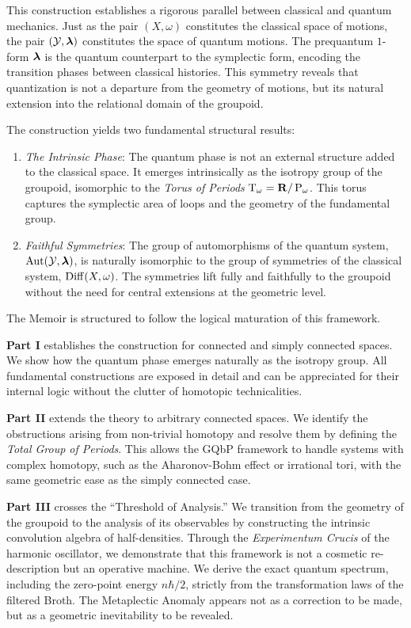 This construction establishes a rigorous parallel between classical and quantum mechanics.
Just as the pair $(X, \omega)$ constitutes the classical space of motions,
the pair $(\mathcal{Y}, \boldsymbol \lambda)$ constitutes the space of quantum motions.
The prequantum $1$-form $\boldsymbol \lambda$ is the quantum counterpart to the symplectic form,
encoding the transition phases between classical histories.
This symmetry reveals that quantization is not a departure from the geometry of motions,
but its natural extension into the relational domain of the groupoid.

The construction yields two fundamental structural results:
\begin{enumerate}
  \item \emph{The Intrinsic Phase}:
  The quantum phase is not an external structure added to the classical space.
  It emerges intrinsically as the isotropy group of the groupoid,
  isomorphic to the \emph{Torus of Periods} $\mathrm{T}_\omega = {\mathbf{R}}/\operatorname{P}_\omega$.
  This torus captures the symplectic area of loops and the geometry of the fundamental group.
  \item \emph{Faithful Symmetries}:
  The group of automorphisms of the quantum system,
  $\operatorname{Aut}(\mathcal{Y},\boldsymbol \lambda)$,
  is naturally isomorphic to the group of symmetries of the classical system,
  $\operatorname{Diff}(X, \omega)$.
  The symmetries lift fully and faithfully to the groupoid without the need for central extensions at the geometric level.
\end{enumerate}

The Memoir is structured to follow the logical maturation of this framework.

\textbf{Part I} establishes the construction for connected and simply connected spaces.
We show how the quantum phase emerges naturally as the isotropy group.
All fundamental constructions are exposed in detail and can be appreciated for their internal logic without the clutter of homotopic technicalities.

\textbf{Part II} extends the theory to arbitrary connected spaces.
We identify the obstructions arising from non-trivial homotopy and resolve them by defining the \emph{Total Group of Periods}.
This allows the GQbP framework to handle systems with complex homotopy,
such as the Aharonov-Bohm effect or irrational tori,
with the same geometric ease as the simply connected case.

\textbf{Part III} crosses the ``Threshold of Analysis.''
We transition from the geometry of the groupoid to the analysis of its observables by constructing the intrinsic convolution algebra of half-densities.
Through the \emph{Experimentum Crucis} of the harmonic oscillator,
we demonstrate that this framework is not a cosmetic re-description but an operative machine.
We derive the exact quantum spectrum,
including the zero-point energy $n\hbar/2$,
strictly from the transformation laws of the filtered Broth.
The Metaplectic Anomaly appears not as a correction to be made,
but as a geometric inevitability to be revealed.

